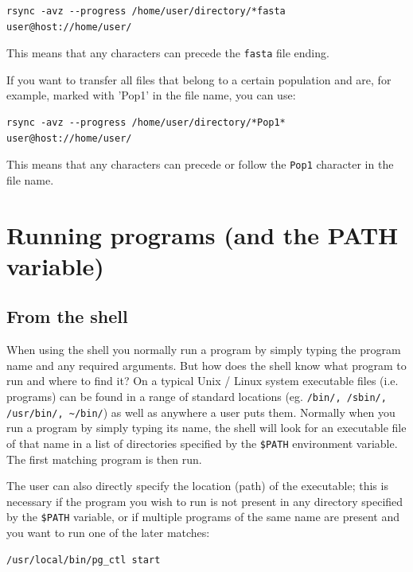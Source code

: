 \documentclass[11pt]{article}
\begin{document}
\begin{verbatim}
rsync -avz --progress /home/user/directory/*fasta user@host://home/user/
\end{verbatim}
This means that any characters can precede the \texttt{fasta} file ending.



If you want to transfer all files that belong to a certain population
and are, for example, marked with 'Pop1' in the file name, you can use:

\begin{verbatim}
rsync -avz --progress /home/user/directory/*Pop1* user@host://home/user/
\end{verbatim}
This means that any characters can precede or follow the \texttt{Pop1}
character in the file name.

\section{Running programs (and the PATH variable)}
\label{sec-3}
\subsection{From the shell}
\label{sec-3-1}
When using the shell you normally run a program by simply typing the
program name and any required arguments. But how does the shell know
what program to run and where to find it? On a typical Unix / Linux
system executable files (i.e. programs) can be found in a range of
standard locations (eg. \texttt{/bin/, /sbin/, /usr/bin/, \textasciitilde{}/bin/}) as well as
anywhere a user puts them. Normally when you run a program by simply
typing its name, the shell will look for an executable file of that name
in a list of directories specified by the \texttt{\$PATH} environment variable.
The first matching program is then run.

The user can also directly specify the location (path) of the
executable; this is necessary if the program you wish to run is not
present in any directory specified by the \texttt{\$PATH} variable, or if
multiple programs of the same name are present and you want to run one
of the later matches:

\begin{verbatim}
/usr/local/bin/pg_ctl start
\end{verbatim}
\end{document}
